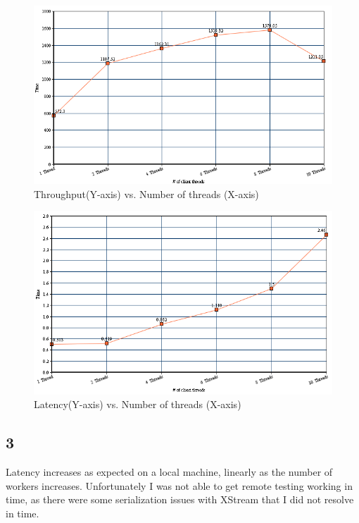 \begin{figure}[h!]
    \includegraphics[scale=0.5]{images/chart1}
    \caption{Throughput(Y-axis) vs. Number of threads (X-axis)}
\end{figure}

\begin{figure}[h!]
    \includegraphics[scale=0.5]{images/chart2}
    \caption{Latency(Y-axis) vs. Number of threads (X-axis)}
\end{figure}

\subsection*{3}
Latency increases as expected on a local machine, linearly as the number of
workers increases. Unfortunately I was not able to get remote testing working in
time, as there were some serialization issues with XStream that I did not
resolve in time.
